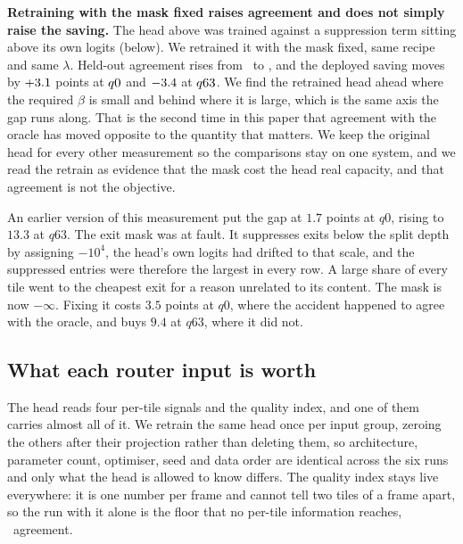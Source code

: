 \documentclass[10pt,twocolumn,letterpaper]{article}
\begin{document}
\textbf{Retraining with the mask fixed raises agreement and does not simply
raise the saving.} The head above was trained against a suppression term sitting
above its own logits (below). We retrained it with the mask fixed, same recipe
and same $\lambda$. Held-out agreement rises from \RetrainAgreeOld\ to
\RetrainAgreeNew, and the deployed saving moves by $+3.1$ points at
$q0$ and $-3.4$ at $q63$. We find the retrained head
ahead where the required $\beta$ is small and behind where it is large, which is
the same axis the gap runs along. That is the second time in this paper that
agreement with the oracle has moved opposite to the quantity that matters. We
keep the original head for every other measurement so the comparisons stay on
one system, and we read the retrain as evidence that the mask cost the head real
capacity, and that agreement is not the objective.

An earlier version of this measurement put the gap at $1.7$ points at $q0$,
rising to $13.3$ at $q63$. The exit mask was at fault. It suppresses exits below
the split depth by assigning $-10^{4}$, the head's own logits had drifted to
that scale, and the suppressed entries were therefore the largest in every row.
A large share of every tile went to the cheapest exit for a reason unrelated to
its content. The mask is now $-\infty$. Fixing it costs $3.5$ points at $q0$,
where the accident happened to agree with the oracle, and buys $9.4$ at $q63$,
where it did not.

\subsection{What each router input is worth}

The head reads four per-tile signals and the quality index, and one of them
carries almost all of it. We retrain the same head once per input group, zeroing
the others after their projection rather than deleting them, so architecture,
parameter count, optimiser, seed and data order are identical across the six
runs and only what the head is allowed to know differs. The quality index stays
live everywhere: it is one number per frame and cannot tell two tiles of a frame
apart, so the run with it alone is the floor that no per-tile information
reaches, \InputQpAgree\ agreement.

\begin{table}[t]
\centering
\resizebox{\columnwidth}{!}{}
\caption{\textbf{What each router input is worth.} Agreement with the search's
exit choice on held-out frames. Read the first column against the last: only the
stem moves agreement away from what a single constant exit already achieves.}
\label{tab:routerinputs}
\end{table}
\end{document}
